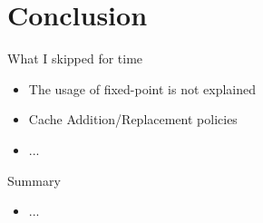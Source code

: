 \section{Conclusion}

\begin{slide}{What I skipped for time}
\begin{itemize}
  \item The usage of fixed-point is not explained
  \item Cache Addition/Replacement policies
  \item ...
\end{itemize}
\end{slide}

\begin{slide}{Summary}
\begin{itemize}
  \item ...
\end{itemize}
\end{slide}